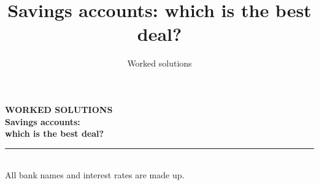 \documentclass[aspectratio=169,12pt]{beamer}
\title{Savings accounts: which is the best deal?}
\subtitle{Worked solutions}
\date{}
\begin{document}
\begin{frame}[plain]
  \vfill
  \hspace*{6mm}%
  \begin{minipage}{0.86\textwidth}
    {\color{inkmuted}\small\bfseries WORKED SOLUTIONS}\\[3mm]
    {\color{slidehead}\fontsize{24}{28}\selectfont\bfseries
     Savings accounts:\\which is the best deal?}\\[4mm]
    \textcolor{slidehead!75}{\rule{28mm}{2.2pt}}\\[4mm]
    {\color{inkmuted}\small All bank names and interest rates are made up.}
  \end{minipage}
  \vfill
\end{frame}

\end{document}
